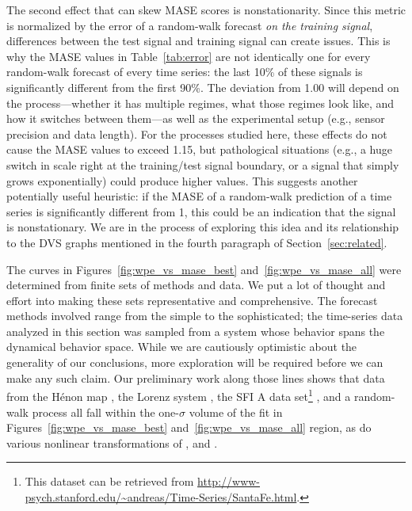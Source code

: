 
The second effect that can skew MASE scores is nonstationarity.  Since
this metric is normalized by the error of a random-walk forecast
\emph{on the training signal}, differences between the test signal and
training signal can create issues.  This is why the MASE values in
Table~\ref{tab:error} are not identically one for every random-walk
forecast of every time series: the last 10\% of these signals is
significantly different from the first 90\%.  The deviation from 1.00
will depend on the process---whether it has multiple regimes, what
those regimes look like, and how it switches between them---as well as
the experimental setup (e.g., sensor precision and data length).  For
the processes studied here, these effects do not cause the MASE values
to exceed 1.15, but pathological situations (e.g., a huge switch in
scale right at the training/test signal boundary, or a signal that
simply grows exponentially) could produce higher values.  This
suggests another potentially useful heuristic: if the MASE of a
random-walk prediction of a time series is significantly different
from 1, this could be an indication that the signal is nonstationary.
We are in the process of exploring this idea and its relationship to
the DVS graphs mentioned in the fourth paragraph of
Section~\ref{sec:related}.

The curves in Figures~\ref{fig:wpe_vs_mase_best}
and~\ref{fig:wpe_vs_mase_all} were determined from finite sets of
methods and data.  We put a lot of thought and effort into making
these sets representative and comprehensive.  The forecast methods
involved range from the simple to the sophisticated; the time-series
data analyzed in this section was sampled from a system whose behavior
spans the dynamical behavior space.  While we are cautiously
optimistic about the generality of our conclusions, more exploration
will be required before we can make any such claim.  Our preliminary
work along those lines shows that data from the H\'enon map
\cite{henon}, the Lorenz system \cite{lorenz}, the SFI A data
set\footnote{This dataset can be retrieved from
  \url{http://www-psych.stanford.edu/~andreas/Time-Series/SantaFe.html}.}
\cite{weigend-book}, and a random-walk process all fall within the
one-$\sigma$ volume of the fit in Figures~\ref{fig:wpe_vs_mase_best}
and~\ref{fig:wpe_vs_mase_all} region, as do various nonlinear
transformations of \svdtwo, \svdfive and \svdsix.

